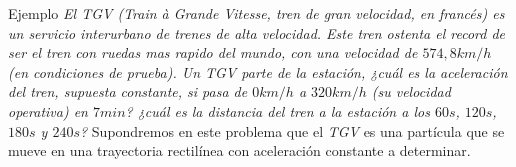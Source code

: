 \begin{example}{Ejemplo}
    {\it El TGV (Train à Grande Vitesse, tren de gran velocidad, en francés) es un servicio interurbano de trenes de alta velocidad. Este tren ostenta el record de ser el tren con ruedas mas rapido del mundo, con una velocidad de $574,8 \si{km/h}$ (en condiciones de prueba). Un TGV parte de la estación, ¿cuál es la aceleración del tren, supuesta constante, si pasa de $0 \si{km/h}$ a $320 \si{km/h}$ (su velocidad operativa) en $7\si{min}$? ¿cuál es la distancia del tren a la estación a los $60\si{s}$, $120\si{s}$, $180\si{s}$ y $240\si{s}$?}
    \tcblower
     { Supondremos en este problema que el {\it TGV} es una partícula que se mueve en una trayectoria rectilínea con aceleración constante a determinar.}
  

\end{example}
